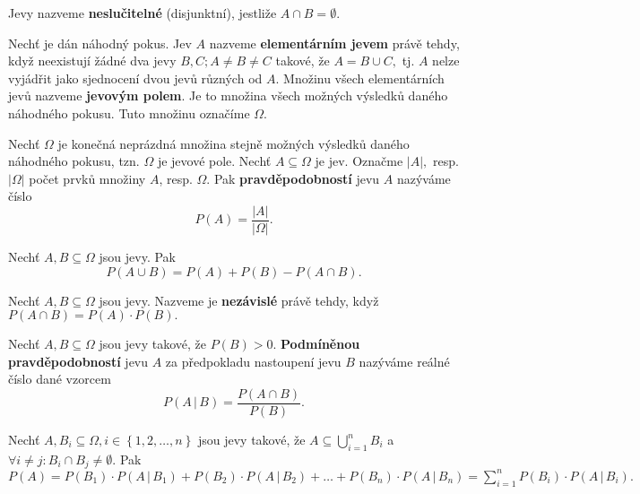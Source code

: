 \begin{definition}
    Jevy nazveme \textbf{neslučitelné} (disjunktní), jestliže $A\cap B = \emptyset.$
\end{definition}

\begin{definition}
    Nechť je dán náhodný pokus. Jev $A$ nazveme \textbf{elementárním jevem} právě tehdy,
    když neexistují žádné dva jevy $B,C; A\ne B\ne C$ takové, že $A=B\cup C,$ tj.
    $A$ nelze vyjádřit jako sjednocení dvou jevů různých od $A.$ Množinu všech
    elementárních jevů nazveme \textbf{jevovým polem}. Je to množina všech možných
    výsledků daného náhodného pokusu. Tuto množinu označíme $\Omega.$
\end{definition}

\begin{definition}
    Nechť $\Omega$ je konečná neprázdná množina stejně možných výsledků daného
    náhodného pokusu, tzn. $\Omega$ je jevové pole. Nechť $A\subseteq \Omega$ je jev.
    Označme $|A|,$ resp. $|\Omega|$ počet prvků množiny $A$, resp. $\Omega.$ Pak
    \textbf{pravděpodobností} jevu $A$ nazýváme číslo
    $$P(A)=\frac{|A|}{|\Omega|}.$$
\end{definition}

\begin{veta}
    Nechť $A,B\subseteq \Omega$ jsou jevy. Pak
    $$P(A\cup B)=P(A)+P(B)-P(A\cap B).$$
\end{veta}

\begin{definition}
    Nechť $A,B\subseteq \Omega$ jsou jevy. Nazveme je \textbf{nezávislé} právě tehdy,
    když $P(A\cap B)=P(A)\cdot P(B).$
\end{definition}

\begin{definition}
    Nechť $A,B\subseteq \Omega$ jsou jevy takové, že $P(B)>0.$ \textbf{Podmíněnou
    pravděpodobností} jevu $A$ za předpokladu nastoupení jevu $B$ nazýváme reálné
    číslo dané vzorcem
    $$P(A\, | \, B) = \frac{P(A\cap B)}{P(B)}.$$
\end{definition}

\begin{veta}
    Nechť $A,B_i \subseteq \Omega, i \in \left \{ 1, 2, \dots, n \right \} $ jsou jevy
    takové, že $A\subseteq \bigcup_{i=1}^n B_i$ a $\forall i\ne j: B_i\cap B_j\ne
    \emptyset.$ Pak $P(A)=P(B_1)\cdot P(A\, |\, B_1) + P(B_2)\cdot P(A \, |\, B_2)+
    \dots + P(B_n)\cdot P(A \,|\, B_n)=\sum_{i=1}^n P(B_i)\cdot P(A\, |\, B_i).$
\end{veta}

